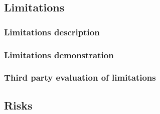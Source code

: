 \documentclass{article}
\begin{document}
\subsection{Limitations}
\subsubsection{Limitations description}


\subsubsection{Limitations demonstration}


\subsubsection{Third party evaluation of limitations}


\subsection{Risks}
\end{document}
